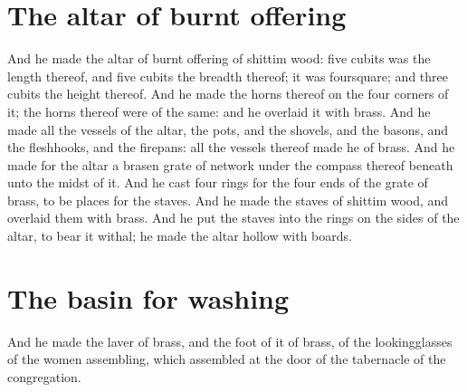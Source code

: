 \section*{The altar of burnt offering}
\begin{biblechapter} %
\verse And he made the altar of burnt offering of shittim wood: five cubits was the length thereof, and five cubits the breadth thereof; it was foursquare; and three cubits the height thereof.
\verse And he made the horns thereof on the four corners of it; the horns thereof were of the same: and he overlaid it with brass.
\verse And he made all the vessels of the altar, the pots, and the shovels, and the basons, and the fleshhooks, and the firepans: all the vessels thereof made he of brass.
\verse And he made for the altar a brasen grate of network under the compass thereof beneath unto the midst of it.
\verse And he cast four rings for the four ends of the grate of brass, to be places for the staves.
\verse And he made the staves of shittim wood, and overlaid them with brass.
\verse And he put the staves into the rings on the sides of the altar, to bear it withal; he made the altar hollow with boards.
\section*{The basin for washing}
\verse And he made the laver of brass, and the foot of it of brass, of the lookingglasses of the women assembling, which assembled at the door of the tabernacle of the congregation.

\end{biblechapter}
